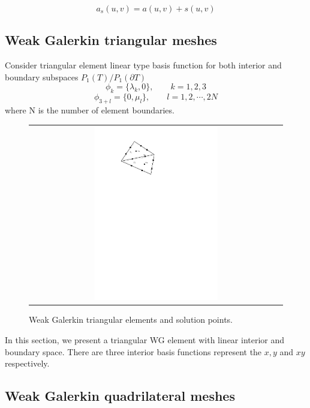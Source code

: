 \begin{equation}
a_{s} (u, v) = a(u, v) + s(u, v)
\end{equation}

\subsection{Weak Galerkin triangular meshes}

Consider triangular element linear type basis function for both interior and boundary subspaces $ P_{1}(T) / P_{1} (\partial T) $
\begin{equation}
\phi_{k} = \{ \lambda_{k}, 0 \}, \qquad k = 1,2, 3
\end{equation}
\begin{equation}
\phi_{3 + l} = \{ 0, \mu_{l} \}, \qquad l = 1, 2, \cdots , 2N
\end{equation}
where N is the number of element boundaries.

\begin{figure}[h]
	\centering
	\begin{tabular}{c}
		\includegraphics[width=0.5\textwidth]{./pics/triangle.pdf}
	\end{tabular}
	\caption{\footnotesize Weak Galerkin triangular elements and solution points.}\label{fig1: triangle}
\end{figure}

In this section, we present a triangular WG element with linear interior and boundary space. There are three interior basis functions represent the $ x, y $ and $ xy $ respectively.

\subsection{Weak Galerkin quadrilateral meshes}

